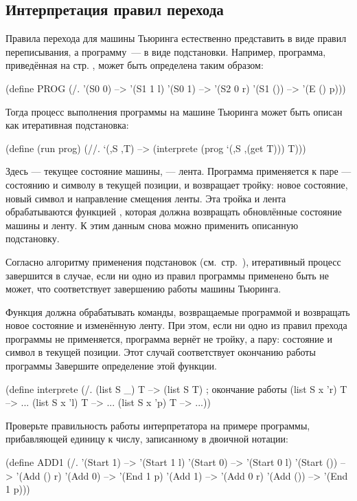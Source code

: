 \subsection*{Интерпретация правил перехода}

Правила перехода для машины Тьюринга естественно представить в виде правил переписывания, а программу~--- в виде подстановки. Например, программа, приведённая на стр. \pageref{TM-prog}, может быть определена таким образом:
\begin{SchemeCode}
  (define PROG
    (/. '(S0 0) --> '(S1 1 l)
        '(S0 1) --> '(S2 0 r)
        '(S1 ()) --> '(E () p)))
\end{SchemeCode}
Тогда процесс выполнения программы на машине Тьюринга может быть описан как итеративная подстановка:
\begin{Definition}[emph={S,T,prog}]
  (define (run prog)
    (//. `(,S ,T) --> (interprete (prog `(,S ,(get T))) T)))
\end{Definition}
Здесь  --- текущее состояние машины,  --- лента. Программа  применяется к паре  --- состоянию и символу в текущей позиции, и возвращает тройку: новое состояние, новый символ и направление смещения ленты. Эта тройка и лента обрабатываются функцией , которая должна  возвращать обновлённые состояние машины и ленту. К этим данным снова можно применить описанную подстановку. 

Согласно алгоритму применения подстановок (см.~стр.~\pageref{rewriting-semantics}), итеративный процесс завершится в случае, если ни одно из правил программы применено быть не может, что соответствует завершению работы машины Тьюринга.

\begin{Assignment}
  Функция  должна обрабатывать команды, возвращаемые программой и возвращать новое состояние и изменённую ленту. При этом, если ни одно из правил прехода программы не применяется, программа вернёт не тройку, а пару: состояние и символ в текущей позиции. Этот случай соответствует окончанию работы программы
Завершите определение этой функции.
\begin{SchemeCode}[emph={S,T,v}]
(define interprete
  (/. (list S _) T --> (list S T) ; окончание работы
      (list S x 'r) T --> ...
      (list S x 'l) T --> ...
      (list S x 'p) T --> ...))
\end{SchemeCode}

Проверьте правильность работы интерпретатора на примере программы, прибавляющей единицу к числу, записанному в двоичной нотации:
\begin{SchemeCode}
(define ADD1
  (/. '(Start 1) --> '(Start 1 l) 
      '(Start 0) --> '(Start 0 l) 
      '(Start ()) --> '(Add () r) 
      '(Add 0) --> '(End 1 p) 
      '(Add 1) --> '(Add 0 r) 
      '(Add ()) --> '(End 1 p)))
\end{SchemeCode}
\end{Assignment}


